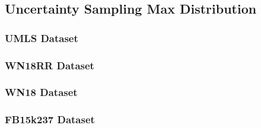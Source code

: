 \subsection{Uncertainty Sampling Max Distribution}

\subsubsection{UMLS Dataset}

\subsubsection{WN18RR Dataset}

\subsubsection{WN18 Dataset}

\subsubsection{FB15k237 Dataset}